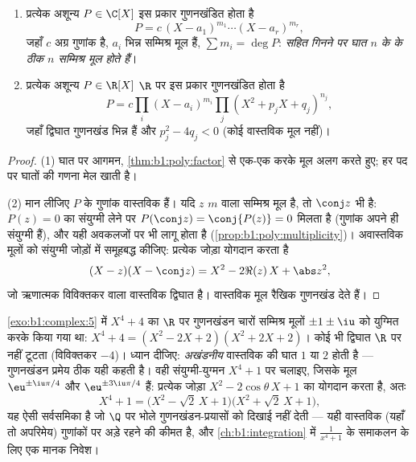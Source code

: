 \begin{corollary}[$\C$ पर और $\R$ पर गुणनखंडन]\label{cor:b1:poly:factorization}
\begin{enumerate}
  \item प्रत्येक अशून्य $P \in \C[X]$ इस प्रकार गुणनखंडित होता है
        \[
        P = c\, (X - a_1)^{m_1} \cdots (X - a_r)^{m_r},
        \]
        जहाँ $c$ अग्र गुणांक है, $a_i$ भिन्न सम्मिश्र मूल हैं, $\sum m_i =
        \deg P$: \emph{ सहित गिनने पर घात $n$ के  के ठीक $n$
        सम्मिश्र मूल होते हैं}।
  \item प्रत्येक अशून्य $P \in \R[X]$ $\R$ पर इस प्रकार गुणनखंडित होता है
        \[
        P = c \prod_i (X - a_i)^{m_i} \prod_j (X^2 + p_j X +
        q_j)^{n_j},
        \]
        जहाँ द्विघात गुणनखंड भिन्न हैं और $p_j^2 - 4q_j < 0$ (कोई वास्तविक
        मूल नहीं)।
\end{enumerate}
\end{corollary}

\begin{proof}
(1) घात पर आगमन, \cref{thm:b1:poly:factor} से एक-एक करके मूल अलग करते हुए;
हर पद पर घातों की गणना मेल खाती है।

(2) मान लीजिए $P$ के गुणांक वास्तविक हैं। यदि $z$  $m$ वाला सम्मिश्र
मूल है, तो $\conj z$ भी है: $P(z) = 0$ का संयुग्मी लेने पर $P(\conj z) =
\conj{P(z)} = 0$ मिलता है (गुणांक अपने ही संयुग्मी हैं), और यही अवकलजों पर
भी लागू होता है (\cref{prop:b1:poly:multiplicity})। अवास्तविक मूलों को
संयुग्मी जोड़ों में समूहबद्ध कीजिए: प्रत्येक जोड़ा योगदान करता है
\[
(X - z)(X - \conj z) = X^2 - 2\Re(z)\, X + \abs z^2 ,
\]
जो ऋणात्मक विविक्तकर वाला वास्तविक द्विघात है। वास्तविक मूल रैखिक गुणनखंड
देते हैं।
\end{proof}

\begin{example}\label{ex:b1:poly:factorexample}
\cref{exo:b1:complex:5} में $X^4 + 4$ का $\R$ पर गुणनखंडन चारों सम्मिश्र
मूलों $\pm 1 \pm \iu$ को युग्मित करके किया गया था: $X^4 + 4 = (X^2 - 2X +
2)(X^2 + 2X + 2)$। कोई भी द्विघात $\R$ पर नहीं टूटता (विविक्तकर $-4$)। ध्यान
दीजिए: \emph{अखंडनीय} वास्तविक  की घात $1$ या $2$ होती है --- गुणनखंडन
प्रमेय ठीक यही कहती है। वही संयुग्मी-युग्मन $X^4 + 1$ पर चलाइए, जिसके मूल
$\eu^{\pm\iu\pi/4}$ और $\eu^{\pm3\iu\pi/4}$ हैं: प्रत्येक जोड़ा $X^2 -
2\cos\theta\,X + 1$ का योगदान करता है, अतः
\[
X^4 + 1 = \bigl(X^2 - \sqrt2\,X + 1\bigr)
\bigl(X^2 + \sqrt2\,X + 1\bigr) ,
\]
यह ऐसी सर्वसमिका है जो $\Q$ पर भोले गुणनखंडन-प्रयासों को दिखाई नहीं देती ---
यही वास्तविक (यहाँ तो अपरिमेय) गुणांकों पर अड़े रहने की कीमत है, और
\cref{ch:b1:integration} में $\frac1{x^4 + 1}$ के समाकलन के लिए एक मानक
निवेश।
\end{example}

